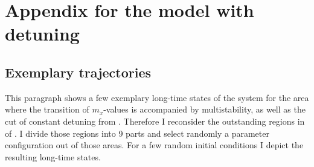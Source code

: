    \chapter{Appendix for the model with detuning}
    \section{Exemplary trajectories}
    \label{appendix:expl_traj}
    This paragraph shows a few exemplary long-time states of the system for the area where the transition of $m_x$-values is accompanied by multistability, as well as the cut of constant detuning from . Therefore I reconsider the outstanding regions in  of . I divide those regions into 9 parts and select randomly a parameter configuration out of those areas. For a few random initial conditions I depict the resulting long-time states.
